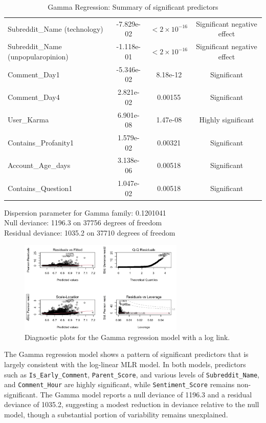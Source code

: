 \documentclass[10pt]{article}
\begin{document}
\begin{table}[H]
\begin{tabular}{lccc}
Subreddit\_Name (technology)    & -7.829e-02 & $<2\times10^{-16}$ & Significant negative effect \\
Subreddit\_Name (unpopularopinion)& -1.118e-01 & $<2\times10^{-16}$ & Significant negative effect \\
Comment\_Day1                   & -5.346e-02 & 8.18e-12         & Significant \\
Comment\_Day4                   & 2.821e-02  & 0.00155          & Significant \\
User\_Karma                     & 6.901e-08  & 1.47e-08         & Highly significant \\
Contains\_Profanity1            & 1.579e-02  & 0.00321          & Significant \\
Account\_Age\_days              & 3.138e-06  & 0.00518          & Significant \\
Contains\_Question1             & 1.047e-02  & 0.00518          & Significant \\
\bottomrule
\end{tabular}

\bigskip
\noindent Dispersion parameter for Gamma family: 0.1201041 \\ Null deviance: 1196.3 on 37756 degrees of freedom \\ Residual deviance: 1035.2 on 37710 degrees of freedom
\caption{Gamma Regression: Summary of significant predictors}
\label{tab:gamma_results}
\end{table}

\begin{figure}[H]
    \centering
    \includegraphics[width=0.7\textwidth]{pictures/gamma_plots.png}
    \caption{Diagnostic plots for the Gamma regression model with a log link.}
    \label{fig:gamma_plots}
\end{figure}

\noindent The Gamma regression model shows a pattern of significant predictors that is largely consistent with the log-linear MLR model. In both models, predictors such as \texttt{Is\_Early\_Comment}, \texttt{Parent\_Score}, and various levels of \texttt{Subreddit\_Name}, and \texttt{Comment\_Hour} are highly significant, while \texttt{Sentiment\_Score} remains non-significant. The Gamma model reports a null deviance of 1196.3 and a residual deviance of 1035.2, suggesting a modest reduction in deviance relative to the null model, though a substantial portion of variability remains unexplained. \\
\end{document}
